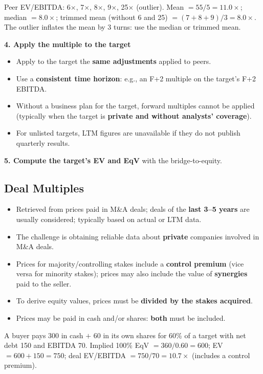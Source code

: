 \begin{exbox}
Peer EV/EBITDA: 6$\times$, 7$\times$, 8$\times$, 9$\times$, 25$\times$ (outlier). Mean $=55/5=11.0\times$; median $=8.0\times$; trimmed mean (without 6 and 25) $=(7+8+9)/3=8.0\times$. The outlier inflates the mean by 3 turns: use the median or trimmed mean.
\end{exbox}
\textbf{4. Apply the multiple to the target}
\begin{itemize}
  \item Apply to the target the \textbf{same adjustments} applied to peers.
  \item Use a \textbf{consistent time horizon}: e.g., an F+2 multiple on the target's F+2 EBITDA.
  \item Without a business plan for the target, forward multiples cannot be applied (typically when the target is \textbf{private and without analysts' coverage}).
  \item For unlisted targets, LTM figures are unavailable if they do not publish quarterly results.
\end{itemize}
\textbf{5. Compute the target's EV and EqV} with the bridge-to-equity.

\subsection{Deal Multiples}
\begin{itemize}
  \item Retrieved from prices paid in M\&A deals; deals of the \textbf{last 3--5 years} are usually considered; typically based on actual or LTM data.
  \item The challenge is obtaining reliable data about \textbf{private} companies involved in M\&A deals.
  \item Prices for majority/controlling stakes include a \textbf{control premium} (vice versa for minority stakes); prices may also include the value of \textbf{synergies} paid to the seller.
  \item To derive equity values, prices must be \textbf{divided by the stakes acquired}.
  \item Prices may be paid in cash and/or shares: \textbf{both} must be included.
\end{itemize}
\begin{exbox}
A buyer pays 300 in cash $+$ 60 in its own shares for 60\% of a target with net debt 150 and EBITDA 70. Implied 100\% EqV $=360/0.60=600$; EV $=600+150=750$; deal EV/EBITDA $=750/70=10.7\times$ (includes a control premium).
\end{exbox}

